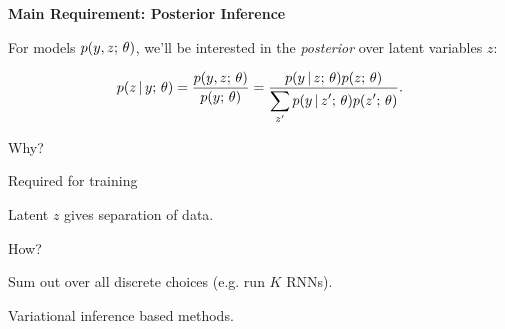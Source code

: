 \documentclass[aspectratio=169]{beamer}
\let\tempone\itemize
\let\temptwo\enditemize
\renewenvironment{itemize}{\tempone\addtolength{\itemsep}{0.5\baselineskip}}{\temptwo}
\newcommand{\thetitle}[1]{{\begin{center}\textbf{{#1}}\end{center}}}
\newcommand{\air}{\vspace{0.25cm}}
\begin{document}





\begin{frame}\thetitle{Main Requirement: Posterior Inference}
    For models $p(y, z ; \, \theta)$, we'll be interested in the \textit{posterior} over latent variables $z$:

    \begin{align*}
        p(z \,|\, y ; \, \theta) = \frac{\displaystyle p(y, z ; \, \theta)}{\displaystyle p(y ; \, \theta)} = \frac{\displaystyle p(y\,|\, z ; \,  \theta) p(z ; \,  \theta)}{\displaystyle \sum_{z'} p(y \,|\, z'; \,  \theta) p(z'; \,  \theta) }.
    \end{align*}

    \air

    \pause
    Why?
    \begin{itemize}
      \item Required for training
      \item Latent $z$ gives separation of data.

    \end{itemize}

    How?

    \begin{itemize}
    \item Sum out over all discrete choices (e.g. run $K$ RNNs).
    \item Variational inference based methods.
    \end{itemize}

\end{frame}
\end{document}
